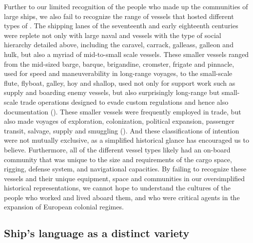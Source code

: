 Further to our limited recognition of the people who made up the communities of large ships, we also fail to recognize the range of vessels that hosted different types of . The shipping lanes of the seventeenth and early eighteenth centuries were replete not only with large naval and  vessels with the type of social hierarchy detailed above, including the caravel, carrack, galleass, galleon and hulk, but also a myriad of mid-to-small scale vessels. These smaller vessels ranged from the mid-sized barge, barque, brigandine, cromster, frigate and pinnacle, used for speed and maneuverability in long-range voyages, to the small-scale flute, flyboat, galley, hoy and shallop, used not only for support work such as supply and boarding enemy vessels, but also surprisingly long-range but small-scale trade operations designed to evade custom regulations and hence also documentation (\citealt{Bicheno2012}). These smaller vessels were frequently employed in trade, but also made voyages of exploration, colonization, political expansion, passenger transit, salvage, supply and smuggling (\citealt{Jarvis2010}). And these classifications of intention were not mutually exclusive, as a simplified historical glance has encouraged us to believe. Furthermore, all of the different vessel types likely had an on-board community that was unique to the size and requirements of the cargo space, rigging, defense system, and navigational capacities. By failing to recognize these vessels and their unique equipment, space and communities in our oversimplified historical representations, we cannot hope to understand the cultures of the people who worked and lived aboard them, and who were critical agents in the expansion of European colonial regimes. 



\subsection{{Ship’s language as a distinct variety}}\label{sec:1.1.2}




